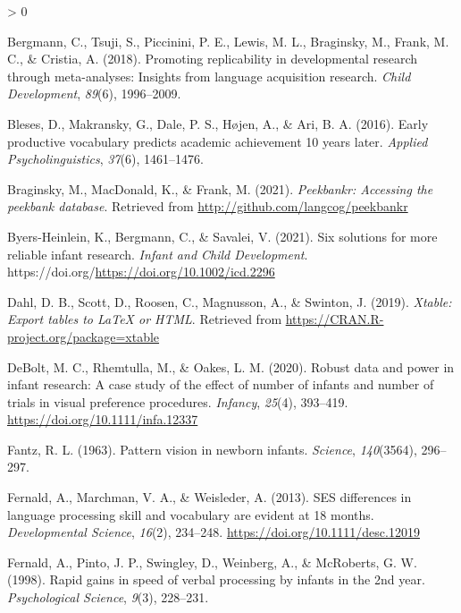 \documentclass[
  english,
  man,floatsintext]{apa6}
\newlength{\cslhangindent}
\newenvironment{CSLReferences}[2] %
 {%
  \setlength{\parindent}{0pt}
  \ifodd #1 \everypar{\setlength{\hangindent}{\cslhangindent}}\ignorespaces\fi
  \ifnum #2 > 0
  \setlength{\parskip}{#2\baselineskip}
  \fi
 }%
 {}
\begin{document}
\begin{CSLReferences}{1}{0}
\leavevmode\hypertarget{ref-bergmann2018}{}%
Bergmann, C., Tsuji, S., Piccinini, P. E., Lewis, M. L., Braginsky, M., Frank, M. C., \& Cristia, A. (2018). {Promoting replicability in developmental research through meta-analyses: Insights from language acquisition research}. \emph{Child Development}, \emph{89}(6), 1996--2009.

\leavevmode\hypertarget{ref-bleses2016}{}%
Bleses, D., Makransky, G., Dale, P. S., Højen, A., \& Ari, B. A. (2016). {Early productive vocabulary predicts academic achievement 10 years later}. \emph{Applied Psycholinguistics}, \emph{37}(6), 1461--1476.

\leavevmode\hypertarget{ref-R-peekbankr}{}%
Braginsky, M., MacDonald, K., \& Frank, M. (2021). \emph{Peekbankr: Accessing the peekbank database}. Retrieved from \url{http://github.com/langcog/peekbankr}

\leavevmode\hypertarget{ref-Byers-Heinlein2021}{}%
Byers-Heinlein, K., Bergmann, C., \& Savalei, V. (2021). {Six solutions for more reliable infant research.} \emph{Infant and Child Development}. https://doi.org/\url{https://doi.org/10.1002/icd.2296}

\leavevmode\hypertarget{ref-R-xtable}{}%
Dahl, D. B., Scott, D., Roosen, C., Magnusson, A., \& Swinton, J. (2019). \emph{Xtable: Export tables to LaTeX or HTML}. Retrieved from \url{https://CRAN.R-project.org/package=xtable}

\leavevmode\hypertarget{ref-DeBolt2020}{}%
DeBolt, M. C., Rhemtulla, M., \& Oakes, L. M. (2020). {Robust data and power in infant research: A case study of the effect of number of infants and number of trials in visual preference procedures}. \emph{Infancy}, \emph{25}(4), 393--419. \url{https://doi.org/10.1111/infa.12337}

\leavevmode\hypertarget{ref-Fantz1963}{}%
Fantz, R. L. (1963). {Pattern vision in newborn infants}. \emph{Science}, \emph{140}(3564), 296--297.

\leavevmode\hypertarget{ref-Fernald2013}{}%
Fernald, A., Marchman, V. A., \& Weisleder, A. (2013). {SES differences in language processing skill and vocabulary are evident at 18 months}. \emph{Developmental Science}, \emph{16}(2), 234--248. \url{https://doi.org/10.1111/desc.12019}

\leavevmode\hypertarget{ref-fernald1998}{}%
Fernald, A., Pinto, J. P., Swingley, D., Weinberg, A., \& McRoberts, G. W. (1998). Rapid gains in speed of verbal processing by infants in the 2nd year. \emph{Psychological Science}, \emph{9}(3), 228--231.


\end{CSLReferences}
\end{document}
